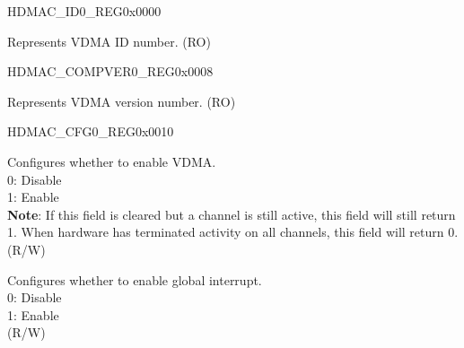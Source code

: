 \begin{register}{H}{DMAC\_ID0\_REG}{0x0000}\label{regdesc:DMACID0REG}
%
\regnewline%
\begin{regdesc}\begin{reglist}
\label{fielddesc:DMACDMACID}\item [DMAC\_DMAC\_ID] Represents VDMA ID number. (RO)
\end{reglist}\end{regdesc}
\end{register}


\begin{register}{H}{DMAC\_COMPVER0\_REG}{0x0008}\label{regdesc:DMACCOMPVER0REG}
%
\regnewline%
\begin{regdesc}\begin{reglist}
\label{fielddesc:DMACDMACCOMPVER}\item [DMAC\_DMAC\_COMPVER] Represents VDMA version number. (RO)
\end{reglist}\end{regdesc}
\end{register}


\begin{register}{H}{DMAC\_CFG0\_REG}{0x0010}\label{regdesc:DMACCFG0REG}
%
%
%
\regnewline%
\begin{regdesc}\begin{reglist}
\label{fielddesc:DMACDMACEN}\item [DMAC\_DMAC\_EN] Configures whether to enable VDMA.\\
0: Disable \\
1: Enable \\
\textbf{Note}: If this field is cleared but a channel is still active, this field will still return 1. When hardware has terminated activity on all channels, this field will return 0.\\
(R/W)
\label{fielddesc:DMACINTEN}\item [DMAC\_INT\_EN] Configures whether to enable global interrupt. \\
0: Disable \\
1: Enable \\
(R/W)
\end{reglist}\end{regdesc}
\end{register}


